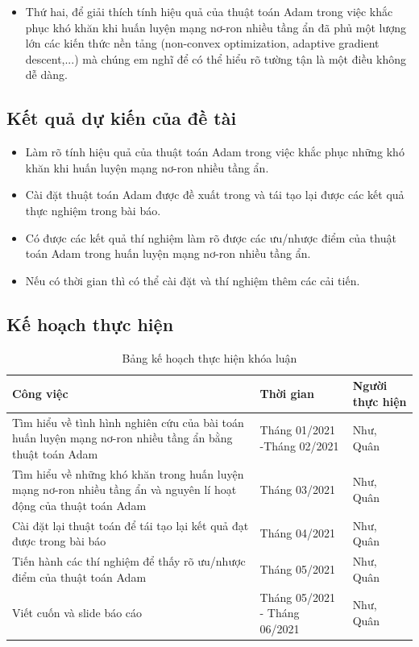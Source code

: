 \documentclass{article}[14pt]
\begin{document}
{\begin{itemize}
        \item Thứ hai, để giải thích tính hiệu quả của thuật toán Adam trong việc khắc phục khó khăn khi huấn luyện mạng nơ-ron nhiều tầng ẩn đã phủ một lượng lớn các kiến thức nền tảng (non-convex optimization, adaptive gradient descent,...) mà chúng em nghĩ để có thể hiểu rõ tường tận là một điều không dễ dàng.
    \end{itemize}
    
    \subsection{Kết quả dự kiến của đề tài}
        
    \begin{itemize}
        \item Làm rõ tính hiệu quả của thuật toán Adam trong việc khắc phục những khó khăn khi huấn luyện mạng nơ-ron nhiều tầng ẩn.
        \item Cài đặt thuật toán Adam được đề xuất trong  \cite{Kingma2015AdamAM} và tái tạo lại được các kết quả thực nghiệm trong bài báo.
        \item Có được các kết quả thí nghiệm làm rõ được các ưu/nhược điểm của thuật toán Adam trong huấn luyện mạng nơ-ron nhiều tầng ẩn.
        \item Nếu có thời gian thì có thể cài đặt và thí nghiệm thêm các cải tiến.
    \end{itemize}
    
    \subsection{Kế hoạch thực hiện}
    
    \begin{table}[H]
    \Large
    \begin{tabular}{ |p{8.5cm}|p{3.75cm}|p{3.75cm}| } 
     \hline
     \textbf{Công việc} & \textbf{Thời gian} & \textbf{Người thực hiện} \\ 
     \hline
     Tìm hiểu về tình hình nghiên cứu của bài toán huấn luyện mạng nơ-ron nhiều tầng ẩn bằng thuật toán Adam & Tháng 01/2021 -Tháng 02/2021 & Như, Quân \\ 
     \hline
     Tìm hiểu về những khó khăn trong huấn luyện mạng nơ-ron nhiều tầng ẩn và nguyên lí hoạt động của thuật toán Adam & Tháng 03/2021 & Như, Quân \\ 
     \hline
     Cài đặt lại thuật toán để tái tạo lại kết quả đạt được trong bài báo & Tháng 04/2021 & Như, Quân \\ 
     \hline
     Tiến hành các thí nghiệm để thấy rõ ưu/nhược điểm của thuật toán Adam & Tháng 05/2021 & Như, Quân \\ 
     \hline
     Viết cuốn và slide báo cáo & Tháng 05/2021 - Tháng 06/2021 & Như, Quân \\ 
     \hline
    \end{tabular}
    \caption{\label{tab:table-name}Bảng kế hoạch thực hiện khóa luận}
    \end{table}
    
    }
    
\end{document}
